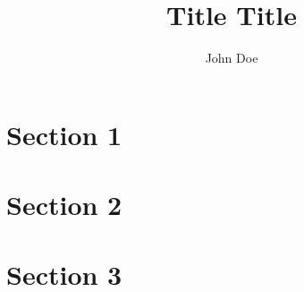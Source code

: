 \documentclass[]{main}
\title{Title Title}
\author{John Doe}
\begin{document}
\maketitle

\begin{abstract}
\lipsum[1]
\end{abstract}

\section{Section 1}

\lipsum[2]

\lipsum[3]

\section{Section 2}

\lipsum[4]

\lipsum[5]

\lipsum[6]

\section{Section 3}

\lipsum[7]

\lipsum[8]

\lipsum[9]
\end{document}
